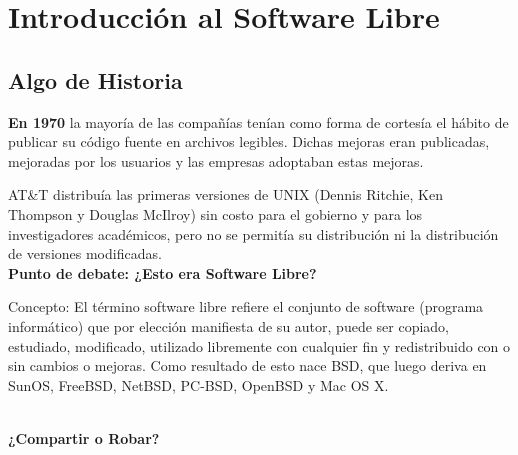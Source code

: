 \chapter{Introducción al Software Libre}

\section{Algo de Historia}

{\bf En 1970} la mayoría de las compañías tenían como forma de cortesía el hábito de publicar su código fuente en archivos legibles. Dichas mejoras eran publicadas, mejoradas por los usuarios y las empresas adoptaban estas mejoras.

AT\&T distribuía las primeras versiones de UNIX (Dennis Ritchie, Ken Thompson y Douglas McIlroy) sin costo para el gobierno y para los investigadores académicos, pero no se permitía su distribución ni la distribución de versiones modificadas. 
\\
{\bf Punto de debate: ¿Esto era Software Libre?}
{\it 

Concepto:
El término software libre refiere el conjunto de software (programa informático) que por elección manifiesta de su autor, puede ser copiado, estudiado, modificado, utilizado libremente con cualquier fin y redistribuido con o sin cambios o mejoras.
Como resultado de esto nace BSD, que luego deriva en SunOS, FreeBSD, NetBSD, PC-BSD, OpenBSD y Mac OS X.
}
\\
{\bf ¿Compartir o Robar?}


